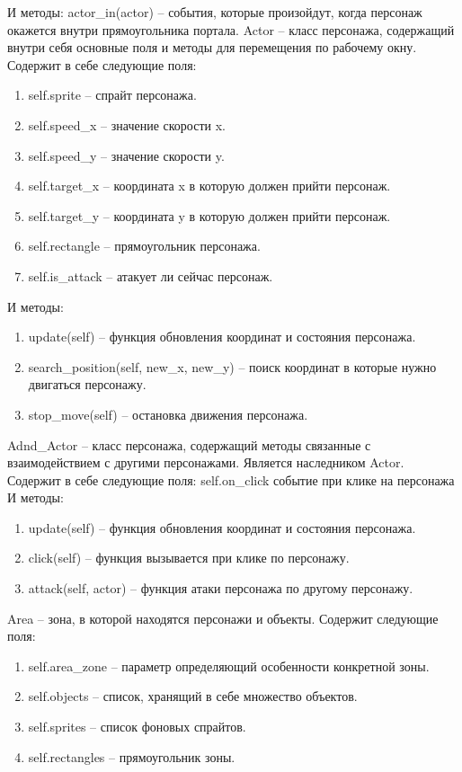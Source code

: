 		И методы:
			actor\_in(actor) -- события, которые произойдут, когда персонаж окажется внутри прямоугольника портала.
	Actor -- класс персонажа, содержащий внутри себя основные поля и методы для перемещения по рабочему окну. Содержит в себе следующие поля:
		\begin{enumerate}
			\item self.sprite -- спрайт персонажа.
			\item self.speed\_x -- значение скорости x.
			\item self.speed\_y -- значение скорости y.
			\item self.target\_x -- координата x в которую должен прийти персонаж.
			\item self.target\_y -- координата y в которую должен прийти персонаж.
			\item self.rectangle -- прямоугольник персонажа.
			\item self.is\_attack -- атакует ли сейчас персонаж.
		\end{enumerate}
		И методы:
		\begin{enumerate}
			\item update(self) -- функция обновления координат и состояния персонажа.
			\item search\_position(self, new\_x, new\_y) -- поиск координат в которые нужно двигаться персонажу.
			\item stop\_move(self) -- остановка движения персонажа.
		\end{enumerate}
	Adnd\_Actor -- класс персонажа, содержащий методы связанные с взаимодействием с другими персонажами. Является наследником Actor. Содержит в себе следующие поля:
		self.on\_click событие при клике на персонажа
		И методы:
		\begin{enumerate}
			\item update(self) -- функция обновления координат и состояния персонажа.
			\item click(self) -- функция вызывается при клике по персонажу.
			\item attack(self, actor) --  функция атаки персонажа по другому персонажу.
		\end{enumerate}
	Area -- зона, в которой находятся персонажи и объекты. Содержит следующие поля:
		\begin{enumerate}
			\item self.area\_zone -- параметр определяющий особенности конкретной зоны.
			\item self.objects -- список, хранящий в себе множество объектов.
			\item self.sprites -- список фоновых спрайтов.
			\item self.rectangles -- прямоугольник зоны.
		\end{enumerate}
